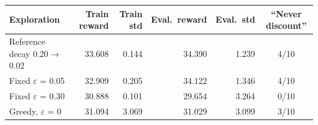 \begin{tabular}{lrrrrc}
\toprule
Exploration & Train reward & Train std & Eval.\ reward & Eval.\ std & ``Never discount'' \\
\midrule
Reference decay 0.20$\to$0.02 & 33.608 & 0.144 & 34.390 & 1.239 & 4/10 \\
Fixed $\varepsilon$ = 0.05 & 32.909 & 0.205 & 34.122 & 1.346 & 4/10 \\
Fixed $\varepsilon$ = 0.30 & 30.888 & 0.101 & 29.654 & 3.264 & 0/10 \\
Greedy, $\varepsilon$ = 0 & 31.094 & 3.069 & 31.029 & 3.099 & 3/10 \\
\bottomrule
\end{tabular}
